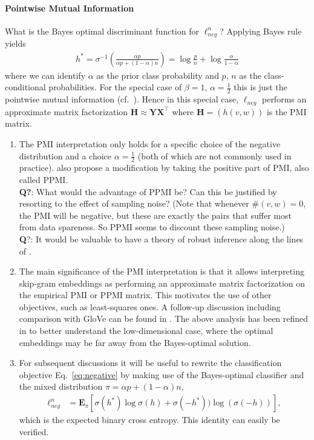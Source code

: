 \documentclass{article}
\newcommand{\E}{{\mathbf E}}
\newcommand{\textbred}[1]{{\color{Red} \textbf #1}}
\begin{document}
\paragraph{Pointwise Mutual Information}

What is the Bayes optimal discriminant function for $\ell^n_{neg}$? Applying Bayes rule yields 
\begin{align}
h^* = \sigma^{-1}\left(\frac{\alpha p}{\alpha p+ (1-\alpha) n}\right)
= \log \frac{p}{n} + \log \frac{\alpha}{1-\alpha}
\label{eq:optimal-cassifier}
\end{align}
where we can identify $\alpha$ as the prior class probability and $p$, $n$ as the class-conditional probabilities. 
For the special case of $\beta=1$, $\alpha=\tfrac 12$  this is just the pointwise mutual information (cf.~\cite{levy2014neural}). Hence in this special case, $\ell_{neg}$ performs an approximate matrix factorization $\mathbf H \approx \mathbf Y \mathbf X^\top$ where $\mathbf H=(h(v,w))$ is the PMI matrix.

\begin{enumerate}
\item The PMI interpretation only holds for a specific choice of the negative distribution and a choice $\alpha=\tfrac 12$ (both of which are not commonly used in practice).  \cite{levy2014neural} also propose a modification by taking the positive part of PMI, also called PPMI.  \\[2mm]
\textbf{Q?}: What would the advantage of PPMI be? Can this be justified by resorting to the effect of sampling noise? (Note that whenever $\#(v,w)=0$, the PMI will be negative, but these are exactly the pairs that suffer most from data spareness. So PPMI seems to discount these sampling noise.)\\[2mm]
\textbred{Q?}: It would be valuable to have a theory of robust inference along the lines of \cite{namkoong2016stochastic,namkoong2017variance}.
\item The main significance of the PMI interpretation is that it allows interpreting skip-gram embeddings as performing an approximate matrix factorization on the empirical PMI or PPMI matrix. This motivates the use of other objectives, such as least-squares ones.  A follow-up discussion including comparison with GloVe \cite{pennington2014glove} can be found in \cite{levy2015improving}. The above analysis has been refined in \cite{melamud2017information} to better understand the low-dimensional case, where the optimal embeddings may be far away from the Bayes-optimal solution. 
\item For subsequent discussions it will be useful to rewrite the classification objective Eq.~\eqref{eq:negative} by making use of the Bayes-optimal classifier and the mixed distribution $\pi = \alpha p + (1-\alpha) n$, 
\begin{align}
\ell^n_{neg}& = \E_{\pi}\left[ \sigma(h^*) \log \sigma(h) + \sigma(-h^*)) \log (\sigma(-h)) \right],
\end{align}
which is the expected binary cross entropy. This identity can easily be verified.
\end{enumerate}
\end{document}
